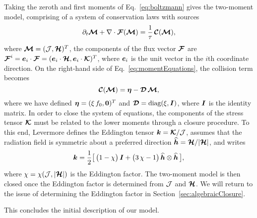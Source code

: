Taking the zeroth and first moments of Eq.~\eqref{eq:boltzmann} gives the two-moment model, comprising of a system of conservation laws with sources
\begin{equation}
  \partial_{t}{\boldsymbol{\mathcal{M}}}+\nabla\cdot\boldsymbol{\mathcal{F}}(\boldsymbol{\mathcal{M}})=\frac{1}{\tau}\,\boldsymbol{\mathcal{C}}(\boldsymbol{\mathcal{M}}),
  \label{eq:momentEquations}
\end{equation}
where $\boldsymbol{\mathcal{M}}=(\mathcal{J},\boldsymbol{\mathcal{H}})^{T}$, the components of the flux vector $\boldsymbol{\mathcal{F}}$ are $\boldsymbol{\mathcal{F}}^{i}=\boldsymbol{e}_{i}\cdot\boldsymbol{\mathcal{F}}=(\boldsymbol{e}_{i}\cdot\boldsymbol{\mathcal{H}},\boldsymbol{e}_{i}\cdot\boldsymbol{\mathcal{K}})^{T}$, where $\boldsymbol{e}_{i}$ is the unit vector in the $i$th coordinate direction.  
On the right-hand side of Eq.~\eqref{eq:momentEquations}, the collision term becomes
\begin{equation}
  \boldsymbol{\mathcal{C}}(\boldsymbol{\mathcal{M}})=\boldsymbol{\eta}-\boldsymbol{\mathcal{D}}\,\boldsymbol{\mathcal{M}}, 
  \label{eq:collisionTermMoments}
\end{equation}
where we have defined $\boldsymbol{\eta}=(\xi\,f_{0},\boldsymbol{0})^{T}$ and $\boldsymbol{\mathcal{D}}=\mbox{diag}(\xi,\boldsymbol{I})$, where $\boldsymbol{I}$ is the identity matrix.  
In order to close the system of equations, the components of the stress tensor $\boldsymbol{\mathcal{K}}$ must be related to the lower moments through a closure procedure.  
To this end, Levermore \cite{levermore_1984} defines the Eddington tensor $\boldsymbol{k}=\boldsymbol{\mathcal{K}}/\mathcal{J}$, assumes that the radiation field is symmetric about a preferred direction $\widehat{\boldsymbol{h}}=\boldsymbol{\mathcal{H}}/|\boldsymbol{\mathcal{H}}|$, and writes
\begin{equation}
  \boldsymbol{k}=\frac{1}{2}\big[\,\big(1-\chi\big)\,\boldsymbol{I}+\big(3\,\chi-1\big)\,\widehat{\boldsymbol{h}}\otimes\widehat{\boldsymbol{h}}\,\big],
  \label{eq:eddingtonTensor}
\end{equation}
where $\chi=\chi(\mathcal{J},|\boldsymbol{\mathcal{H}}|)$ is the Eddington factor.  
The two-moment model is then closed once the Eddington factor is determined from $\mathcal{J}$ and $\boldsymbol{\mathcal{H}}$.  
We will return to the issue of determining the Eddington factor in Section~\ref{sec:algebraicClosure}.  

This concludes the initial description of our model.  